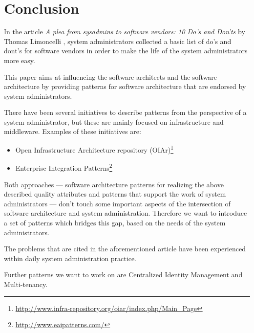\section{Conclusion} 


In the article \textit{A plea from sysadmins to software vendors: 10 Do's and Don'ts} by Thomas Limoncelli \cite{Limoncelli2011a}, system administrators collected a basic list of do's and dont's for software vendors in order to make the life of the system administrators more easy. 

This paper aims at influencing the software architects and the software architecture by providing patterns for software architecture that are endorsed by system administrators.

There have been several initiatives to describe patterns from the perspective of a system administrator, but these are mainly focused on infrastructure and middleware. Examples of these initiatives are: 
\begin{itemize}
	\item Open Infrastructure Architecture repository (OIAr)\footnote{\url{http://www.infra-repository.org/oiar/index.php/Main_Page}} 
	\item Enterprise Integration Patterns\footnote{\url{http://www.eaipatterns.com/}}
\end{itemize}

Both approaches --- software architecture patterns for realizing the above described quality attributes and patterns that support the work of system administrators --- don't touch some important aspects of the intersection of software architecture and system administration. Therefore we want
to introduce a set of patterns which bridges this gap, based on the needs of the system administrators. 

The problems that are cited in the aforementioned article have been experienced within daily system administration practice. 

Further patterns we want to work on are {\sc Centralized Identity Management} and {\sc Multi-tenancy}.

